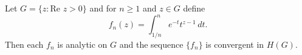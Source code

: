 Let $G = \{z: \text{Re } z > 0\}$ and for $n \geq 1$ and $z \in G$ define
$$f_n(z) = \int_{1/n}^{n} e^{-t} t^{z-1} \, dt.$$
Then each $f_n$ is analytic on $G$ and the sequence $\{f_n\}$ is convergent in $H(G)$.
